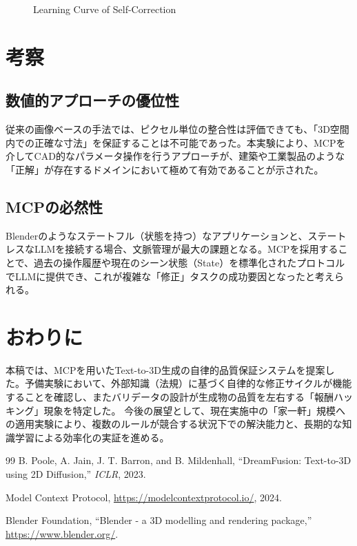 \documentclass{deimj}
\begin{document}
\begin{figure}[t]
 \centering
 \caption{Learning Curve of Self-Correction}
 \label{fig:learning_curve}
\end{figure}

\section{考察}

\subsection{数値的アプローチの優位性}
従来の画像ベースの手法では、ピクセル単位の整合性は評価できても、「3D空間内での正確な寸法」を保証することは不可能であった。本実験により、MCPを介してCAD的なパラメータ操作を行うアプローチが、建築や工業製品のような「正解」が存在するドメインにおいて極めて有効であることが示された。

\subsection{MCPの必然性}
Blenderのようなステートフル（状態を持つ）なアプリケーションと、ステートレスなLLMを接続する場合、文脈管理が最大の課題となる。MCPを採用することで、過去の操作履歴や現在のシーン状態（State）を標準化されたプロトコルでLLMに提供でき、これが複雑な「修正」タスクの成功要因となったと考えられる。

\section{おわりに}
本稿では、MCPを用いたText-to-3D生成の自律的品質保証システムを提案した。予備実験において、外部知識（法規）に基づく自律的な修正サイクルが機能することを確認し、またバリデータの設計が生成物の品質を左右する「報酬ハッキング」現象を特定した。
今後の展望として、現在実施中の「家一軒」規模への適用実験により、複数のルールが競合する状況下での解決能力と、長期的な知識学習による効率化の実証を進める。

\vspace{2em}

\begin{thebibliography}{99}
  B. Poole, A. Jain, J. T. Barron, and B. Mildenhall,
  ``DreamFusion: Text-to-3D using 2D Diffusion,''
  \textit{ICLR}, 2023.

  Model Context Protocol,
  \url{https://modelcontextprotocol.io/}, 2024.

  Blender Foundation,
  ``Blender - a 3D modelling and rendering package,''
  \url{https://www.blender.org/}.
  
\end{thebibliography}

% 
% 
\end{document}
